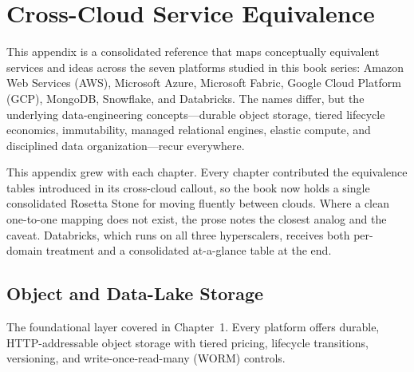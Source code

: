 \chapter{Cross-Cloud Service Equivalence}
%
This appendix is a consolidated reference that maps conceptually equivalent services and
ideas across the seven platforms studied in this book series: Amazon Web Services
(AWS), Microsoft Azure, Microsoft Fabric, Google Cloud Platform (GCP), MongoDB,
Snowflake, and Databricks. The names differ, but the underlying data-engineering concepts---durable
object storage, tiered lifecycle economics, immutability, managed relational engines,
elastic compute, and disciplined data organization---recur everywhere.

\begin{notebox}
This appendix grew with each chapter. Every chapter contributed the equivalence
tables introduced in its cross-cloud callout, so the book now holds
a single consolidated Rosetta Stone for moving fluently between clouds. Where a clean
one-to-one mapping does not exist, the prose notes the closest analog and the caveat.
Databricks, which runs on all three hyperscalers, receives both per-domain treatment and a
consolidated at-a-glance table at the end.
\end{notebox}

\section{Object and Data-Lake Storage}
%
The foundational layer covered in Chapter~1. Every platform offers durable, HTTP-addressable
object storage with tiered pricing, lifecycle transitions, versioning, and write-once-read-many
(WORM) controls.

